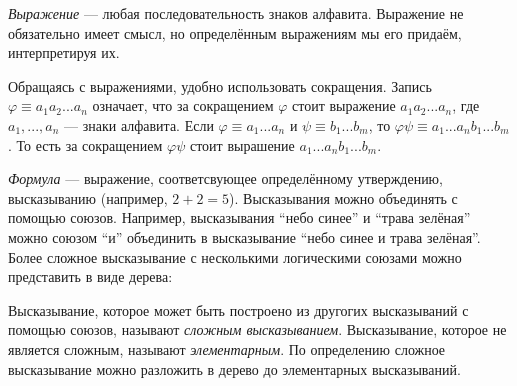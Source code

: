 {\it Выражение} --- любая последовательность знаков алфавита.
Выражение не обязательно имеет смысл, но определённым выражениям мы его придаём,
интерпретируя их.

Обращаясь с выражениями, удобно использовать сокращения. Запись
$\varphi\equiv a_1a_2...a_{n}$ означает, что за сокращением $\varphi$
стоит выражение $a_1a_2...a_{n}$, где $a_1,...,a_{n}$ --- знаки алфавита.
Если ${\varphi\equiv a_1...a_{n}}$ и ${\psi\equiv b_1...b_{m}}$,
то $\varphi\psi\equiv a_1...a_{n}b_1...b_{m}$. То есть
за сокращением $\varphi\psi$ стоит вырашение $a_1...a_{n}b_1...b_{m}$.



  {\it Формула} --- выражение,
соответсвующее определённому утверждению, высказыванию
(например, $2+2=5$). Высказывания можно объединять с помощью
союзов. Например, высказывания ``небо синее''
и ``трава зелёная'' можно союзом ``и'' объединить в высказывание
``небо синее и трава зелёная''. Более сложное высказывание с несколькими
логическими союзами можно представить в виде дерева:

\vspace{-1em}
\begin{center}
\end{center}

Высказывание, которое может быть построено из другогих высказываний с помощью
союзов, называют {\it сложным высказыванием}.
Высказывание, которое не является сложным, называют {\it элементарным}.
По определению сложное высказывание можно разложить в дерево до
элементарных высказываний.

